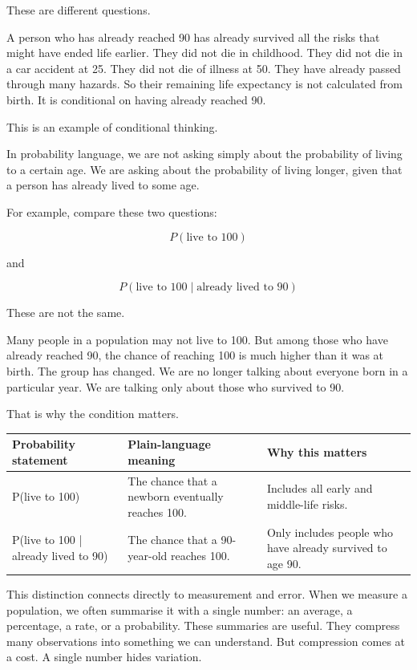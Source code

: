 \documentclass[
  letterpaper,
  DIV=11,
  numbers=noendperiod]{scrreprt}
\begin{document}
These are different questions.

A person who has already reached 90 has already survived all the risks
that might have ended life earlier. They did not die in childhood. They
did not die in a car accident at 25. They did not die of illness at 50.
They have already passed through many hazards. So their remaining life
expectancy is not calculated from birth. It is conditional on having
already reached 90.

This is an example of conditional thinking.

In probability language, we are not asking simply about the probability
of living to a certain age. We are asking about the probability of
living longer, given that a person has already lived to some age.

For example, compare these two questions:

\[
P(\text{live to 100})
\]

and

\[
P(\text{live to 100} \mid \text{already lived to 90})
\]

These are not the same.

Many people in a population may not live to 100. But among those who
have already reached 90, the chance of reaching 100 is much higher than
it was at birth. The group has changed. We are no longer talking about
everyone born in a particular year. We are talking only about those who
survived to 90.

That is why the condition matters.

\begin{table}
\fontsize{12.0pt}{14.0pt}\selectfont
\begin{tabular*}{\linewidth}{@{\extracolsep{\fill}}lll}
\toprule
Probability statement & Plain-language meaning & Why this matters \\ 
\midrule\addlinespace[2.5pt]
P(live to 100) & The chance that a newborn eventually reaches 100. & Includes all early and middle-life risks. \\ 
P(live to 100 | already lived to 90) & The chance that a 90-year-old reaches 100. & Only includes people who have already survived to age 90. \\ 
\bottomrule
\end{tabular*}
\end{table}

This distinction connects directly to measurement and error. When we
measure a population, we often summarise it with a single number: an
average, a percentage, a rate, or a probability. These summaries are
useful. They compress many observations into something we can
understand. But compression comes at a cost. A single number hides
variation.
\end{document}
